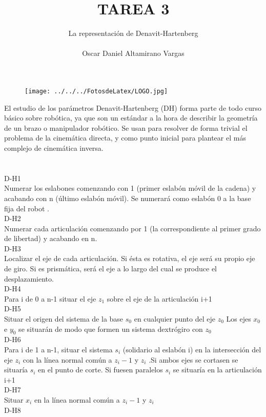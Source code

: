 \documentclass[12pt]{article}
\title{TAREA 3}
\author{La representación de Denavit-Hartenberg \\ \\ Oscar Daniel Altamirano Vargas\\}
\begin{document}
 
\maketitle
\begin{figure}[hbtp]
\centering
\texttt{[image: ../../../FotosdeLatex/LOGO.jpg]}
\end{figure}
\pagebreak

El estudio de los parámetros Denavit-Hartenberg (DH) forma parte de todo curso básico sobre robótica, ya que son un estándar a la hora de describir la geometría de un brazo o manipulador robótico.  Se usan para resolver de forma trivial el problema de la cinemática directa, y como punto inicial para plantear el más complejo de cinemática inversa.\cite{Robots2014} \\ \\ \\ 
D-H1\\
Numerar los eslabones comenzando con 1 (primer eslabón móvil de la cadena) y acabando con n (último eslabón móvil). Se numerará como eslabón 0 a la base fija del robot .\\
D-H2\\
Numerar cada articulación comenzando por 1 (la correspondiente al primer grado de libertad) y acabando en n.\\
D-H3\\
Localizar el eje de cada articulación. Si ésta es rotativa, el eje será su propio eje de giro. Si es prismática, será el eje a lo largo del cual se produce el desplazamiento.\\
D-H4\\
Para i de 0 a n-1 situar el eje $ z_1 $ sobre el eje de la  articulación i+1\\
D-H5\\
Situar el origen del sistema de la base {$ {s_0} $} en cualquier punto del eje $ z_0 $  Los ejes $ x_0 $ e $ y_0 $ se situarán de modo que formen un sistema dextrógiro con $ z_0 $ \\
D-H6\\
 Para i de 1 a n-1, situar el sistema $ s_i $ (solidario al eslabón i) en la intersección del eje $ z_i $ con la línea normal común a $ z_i-1 $ y $ z_i $ .Si ambos ejes se cortasen se situaría $ s_i $ en el punto de corte. Si fuesen paralelos $ s_i $ se situaría en la articulación i+1\\
D-H7\\
Situar $ x_i $ en la línea normal común a $ z_i-1 $ y $ z_i $\\
D-H8\\
\end{document}
